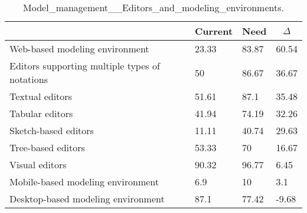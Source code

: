 
  \begin{table*}[]
  \centering
  \notsotiny
  \caption{ Model_management__Editors_and_modeling_environments.}
\label{tab:model_management__editors_and_modeling_environments}
\begin{tabular}{|l|l|l|l|}
  \hline
  \rowcolor[HTML]{C0C0C0}
    \multicolumn{1}{|c|}{Feature} & \multicolumn{1}{c|}{Current} & \multicolumn{1}{c|}{Need} & \multicolumn{1}{c|}{$\Delta$} \\ \hline
  Web-based modeling environment & 23.33 & 83.87 & 60.54 \\ \hline 
Editors supporting multiple types of notations & 50 & 86.67 & 36.67 \\ \hline 
Textual editors & 51.61 & 87.1 & 35.48 \\ \hline 
Tabular editors & 41.94 & 74.19 & 32.26 \\ \hline 
Sketch-based editors & 11.11 & 40.74 & 29.63 \\ \hline 
Tree-based editors & 53.33 & 70 & 16.67 \\ \hline 
Visual editors & 90.32 & 96.77 & 6.45 \\ \hline 
Mobile-based modeling environment & 6.9 & 10 & 3.1 \\ \hline 
Desktop-based modeling environment & 87.1 & 77.42 & -9.68 \\ \hline 
\end{tabular}%
  \end{table*}